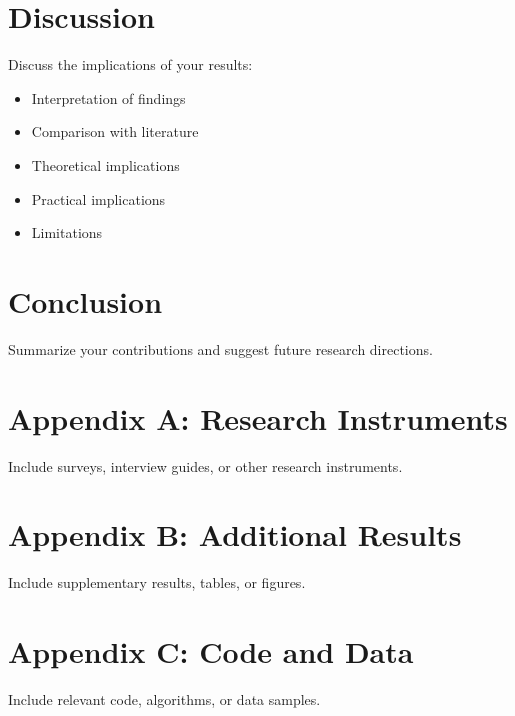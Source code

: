 \documentclass[12pt]{report}
\begin{document}
\chapter{Discussion}
Discuss the implications of your results:
\begin{itemize}
    \item Interpretation of findings
    \item Comparison with literature
    \item Theoretical implications
    \item Practical implications
    \item Limitations
\end{itemize}

\chapter{Conclusion}
Summarize your contributions and suggest future research directions.




\appendix
\chapter{Appendix A: Research Instruments}
Include surveys, interview guides, or other research instruments.

\chapter{Appendix B: Additional Results}
Include supplementary results, tables, or figures.

\chapter{Appendix C: Code and Data}
Include relevant code, algorithms, or data samples.
\end{document}

